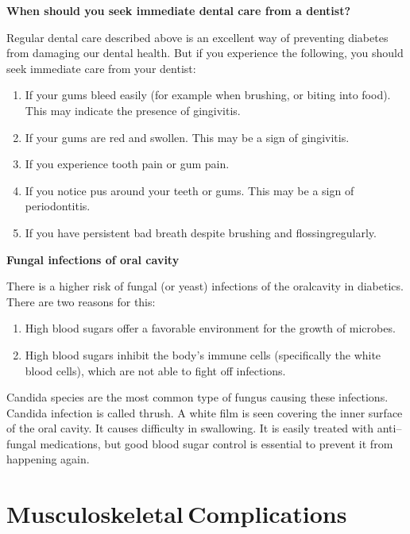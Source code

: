 \noindent\textbf{When should you seek immediate dental care from a dentist?}

Regular dental care described above is an excellent way of preve\-nting diabetes from damaging our dental health. But if you experience the following, you should seek immediate care from your dentist:

\begin{enumerate}[•]
\itemsep=0pt
\item If your gums bleed easily (for example when brushing, or biting into food). This may indicate the presence of gingivitis.
\item If your gums are red and swollen. This may be a sign of gingivitis.
\item If you experience tooth pain or gum pain.
\item If you notice pus around your teeth or gums. This may be a sign of periodontitis.
\item If you have persistent bad breath despite brushing and flossing\break regularly.
\end{enumerate}

\noindent\textbf{Fungal infections of oral cavity}

There is a higher risk of fungal (or yeast) infections of the oral\break cavity in diabetics. There are two reasons for this:

\begin{enumerate}[•]
\itemsep=0pt
\item High blood sugars offer a favorable environment for the growth of microbes.
\item High blood sugars inhibit the body’s immune cells (specifically the white blood cells), which are not able to fight off infections.
\end{enumerate}

Candida species are the most common type of fungus causing these infections. Candida infection is called thrush. A white film is seen covering the inner surface of the oral cavity. It causes difficulty in swallowing. It is easily treated with anti–fungal medications, but good blood sugar control is essential to prevent it from happening again.

\newpage

\renewcommand{\thechapter}{\arabic{chapter}}
\chapter{Musculoskeletal Complications}\label{chap19}

